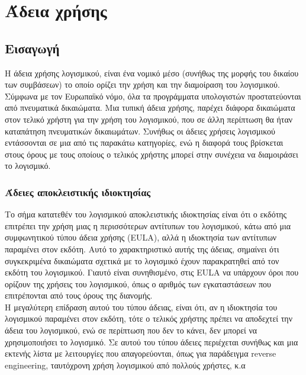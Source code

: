 %
%
%
%
%
\section{Άδεια χρήσης}
\subsection{Εισαγωγή}
Η άδεια χρήσης λογισμικού, είναι ένα νομικό μέσο (συνήθως της μορφής του δικαίου των συμβάσεων) το οποίο ορίζει την χρήση και την διαμοίραση του λογισμικού. Σύμφωνα με τον Ευρωπαϊκό νόμο, όλα τα προγράμματα υπολογιστών προστατεύονται από πνευματικά δικαιώματα. Μια τυπική άδεια χρήσης, παρέχει διάφορα δικαιώματα στον τελικό χρήστη για την χρήση του λογισμικού, που σε άλλη περίπτωση θα ήταν καταπάτηση πνευματικών δικαιωμάτων.
Συνήθως οι άδειες χρήσεις λογισμικού εντάσσονται σε μια από τις παρακάτω κατηγορίες, ενώ η διαφορά τους βρίσκεται στους όρους με τους οποίους ο τελικός χρήστης μπορεί στην συνέχεια να διαμοιράσει το λογισμικό.
\subsubsection{Άδειες αποκλειστικής ιδιοκτησίας}
Το σήμα κατατεθέν του λογισμικού αποκλειστικής ιδιοκτησίας είναι ότι ο εκδότης επιτρέπει την χρήση μιας η περισσότερων αντίτυπων του λογισμικού, κάτω από μια συμφωνητικού τύπου άδεια χρήσης (EULA), αλλά η ιδιοκτησία των αντίτυπων παραμένει στον εκδότη. Αυτό το χαρακτηριστικό αυτής της άδειας, σημαίνει ότι συγκεκριμένα δικαιώματα σχετικά με το λογισμικό έχουν παρακρατηθεί από τον εκδότη του λογισμικού. Γιαυτό είναι συνηθισμένο, στις EULA να υπάρχουν όροι που ορίζουν της χρήσεις του λογισμικού, όπως ο αριθμός των εγκαταστάσεων που επιτρέπονται από τους όρους της διανομής.\\
Η μεγαλύτερη επίδραση αυτού του τύπου άδειας, είναι ότι, αν η ιδιοκτησία του λογισμικού παραμένει στον εκδότη, τότε ο τελικός χρήστης πρέπει να αποδεχτεί την άδεια του λογισμικού, ενώ σε περίπτωση που δεν το κάνει, δεν μπορεί να χρησιμοποιήσει το λογισμικό. Σε αυτού του τύπου άδειες περιέχεται συνήθως και μια εκτενής λίστα με λειτουργίες που απαγορεύονται, όπως για παράδειγμα reverse engineering, ταυτόχρονη χρήση λογισμικού από πολλούς χρήστες, κ.α
